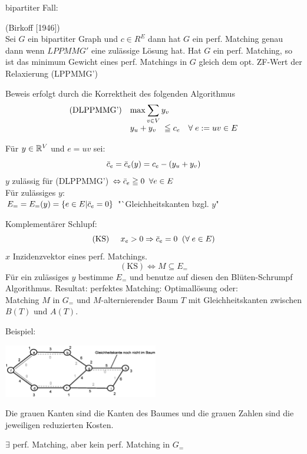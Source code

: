 bipartiter Fall:
\begin{satz} \label{BipBirkoff} (Birkoff [1946])\\
Sei $G$ ein bipartiter Graph und $c\in R^E$ dann hat $G$ ein perf. Matching
genau dann wenn $LPPMMG'$ eine zulässige Lösung hat. Hat $G$ ein perf.
Matching, so ist das minimum Gewicht eines perf. Matchings in $G$ gleich dem
opt. ZF-Wert der Relaxierung (LPPMMG')
\end{satz}
Beweis erfolgt durch die Korrektheit des folgenden Algorithmus
\[
\begin{array}{lrcll} \mbox{(DLPPMMG')}& \multicolumn{3}{l}{\max 
\displaystyle \sum_{v\in V} y_v}\\
&y_u + y_v &\leqq c_e & \forall \; e := u v \in E
\end{array}\]

Für $y\in \mathbb{R}^V$ und $e = u v$ sei:
\[ \bar{c}_{e} = \bar{c}_{e}(y) = c_e - (y_u + y_v)\]
$y$ zulässig für (DLPPMMG') $\Leftrightarrow \bar{c}_e \geqq 0 \; \; \forall e
\in E$\\
Für zulässiges $y$:\\
$E_{=} = E_{=}(y)= \{ e \in E | \bar{c}_e = 0\}$ "`Gleichheitskanten bzgl.
$y$"

Komplementärer Schlupf:
\[(\mbox{KS}) \hspace{5mm} x_e > 0 \Rightarrow \bar{c}_e = 0 \; \; (\forall \;
e \in E)\]
$x$ Inzidenzvektor eines perf. Matchings.
\[(\mbox{KS}) \Leftrightarrow M \subseteq E_{=}\]
Für ein zulässiges $y$ bestimme $E_{=}$ und benutze auf diesen den
Blüten-Schrumpf Algorithmus. Resultat: perfektes Matching: Optimallösung
oder:\\
Matching $M$ in $G_{=}$ und $M$-alternierender Baum $T$ mit
Gleichheitskanten zwischen $B(T)$ und $A(T)$.

Beispiel:

\includegraphics[height=2.3cm]{bilder/5-3StartMax}

Die grauen Kanten sind die Kanten des Baumes und die grauen Zahlen sind die
jeweiligen reduzierten Kosten.

$\exists$ perf. Matching, aber kein perf. Matching in $G_{=}$

